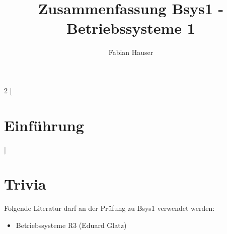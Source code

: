 

\title{Zusammenfassung Bsys1 - Betriebssysteme 1}
\author{Fabian Hauser}
 

\maketitle
\begin{multicols}{2}
[
\section{Einführung}
]



\end{multicols}

\section{Trivia}
Folgende Literatur darf an der Prüfung zu Bsys1 verwendet werden:
\begin{itemize}
	\item Betriebssysteme R3 (Eduard Glatz)
\end{itemize}



